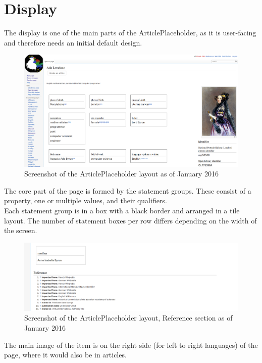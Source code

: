 \newpage
\section{Display}
	The display is one of the main parts of the ArticlePlaceholder, as it is user-facing and therefore needs an initial default design. \\
	\begin{figure}[H]
		\centering
		\includegraphics[width=\textwidth]{diagrams/Screenshot-ArticlePlaceholder.png}
		\caption{Screenshot of the ArticlePlaceholder layout as of January 2016}
		\label{screenshot}
	\end{figure}
	The core part of the page is formed by the statement groups. These consist of a property, one or multiple values, and their qualifiers. \\
	Each statement group is in a box with a black border and arranged in a tile layout. The number of statement boxes per row differs depending on the width of the screen. \\
	\begin{figure}[H]
		\centering
		\includegraphics[width=\textwidth]{diagrams/references.png}
		\caption{Screenshot of the ArticlePlaceholder layout, Reference section as of January 2016}
		\label{fig:references}
	\end{figure}
	The main image of the item is on the right side (for left to right languages) of the page, where it would also be in articles.\\
